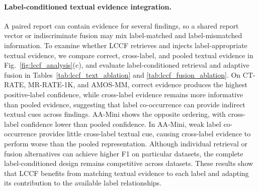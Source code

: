 \paragraph{Label-conditioned textual evidence integration.}
A paired report can contain evidence for several findings, so a shared report
vector or indiscriminate fusion may mix label-matched and label-mismatched
information.  To examine whether LCCF retrieves and injects label-appropriate
textual evidence, we compare correct, cross-label, and pooled textual evidence
in Fig.~\ref{fig:lccf_analysis}(c), and evaluate label-conditioned retrieval and
adaptive fusion in Tables~\ref{tab:lccf_text_ablation} and
\ref{tab:lccf_fusion_ablation}.  On CT-RATE, MR-RATE-1K, and AMOS-MM, correct
evidence produces the highest positive-label confidence, while cross-label
evidence remains more informative than pooled evidence, suggesting that label
co-occurrence can provide indirect textual cues across findings.  AA-Mini shows
the opposite ordering, with cross-label confidence lower than pooled confidence.
In AA-Mini, weak label co-occurrence provides little cross-label textual cue,
causing cross-label evidence to perform worse than the pooled representation.
Although
individual retrieval or fusion alternatives can achieve higher F1 on particular
datasets, the complete label-conditioned design remains competitive across
datasets.  These results show that LCCF benefits from matching textual evidence
to each label and adapting its contribution to the available label relationships.


